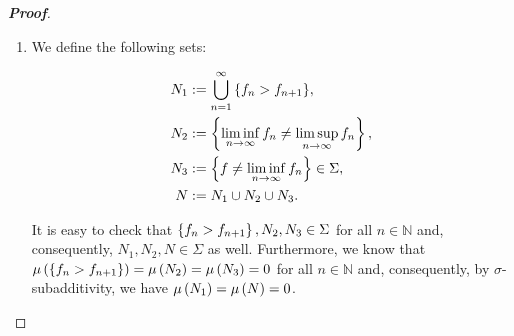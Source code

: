\begin{theorem}
\begin{proof}[\rm\textbf{Proof}]
\begin{enumerate}
      \begin{equation}
        \int_{X}{f_n\,d\mu}\geq\int_{E_n}{f_n\,d\mu}\geq\int_{E_n}{\pr{c\cdot\varphi}\,d\mu}=c\cdot\int_{E_n}{\varphi\,d\mu}.
      \end{equation}

      Since the map $\nu_{c\cdot\varphi}:E\in\Sigma\mapsto\int_{E}{\pr{c\cdot\varphi}\,d\mu}\in\br{0,+\infty}$ is a measure on $\pr{X,\Sigma}$ and $E_n\subseteq E_{n+1}$ for all $n\in\mathbb{N}$, we have:

      \begin{equation}
        \begin{split}
          c\cdot\int_{X}{\varphi\,d\mu} & =\int_{X}{\pr{c\cdot\varphi}\,d\mu}=\int_{N^c}{\pr{c\cdot\varphi}\,d\mu}=\nu_{c\cdot\varphi}\pr{N^c}=\nu_{c\cdot\varphi}\pr{\bigcup_{n=1}^{\infty}{E_n}}\\
          & =\lim_{n\to\infty}{\nu_{c\cdot\varphi}\pr{E_n}}=\lim_{n\to\infty}{\int_{E_n}{\pr{c\cdot\varphi}\,d\mu}}\leq\lim_{n\to\infty}{\int_{X}{f_n}\,d\mu}.
        \end{split}
      \end{equation}

      Taking the limit when $c\to 1^-$, we obtained $\int_{X}{\varphi\,d\mu}\leq\lim_{n\to\infty}{\int_{X}{f_n}\,d\mu}$. Thus $\int_{X}{f\,d\mu}\leq\lim_{n\to\infty}{\int_{X}{f_n\,d\mu}}$. Therefore:

      \begin{equation}
        \lim_{n\to\infty}{\int_{X}{f_n}\,d\mu}=\int_{X}{f\,d\mu}.
      \end{equation}
      \item We define the following sets:
      
      \begin{equation}
        \begin{split}
          N_1 & :=\bigcup_{n=1}^{\infty}{\left\{f_n>f_{n+1}\right\}},\\
          N_2 & :=\left\{\liminf_{n\to\infty}{f_n}\neq\limsup_{n\to\infty}{f_n}\right\},\\
          N_3 & :=\left\{f\neq\liminf_{n\to\infty}{f_n}\right\}\in\Sigma,\\
          N & :=N_1\cup N_2\cup N_3.
        \end{split}
      \end{equation}
      
      It is easy to check that $\left\{f_n>f_{n+1}\right\},N_2,N_3\in\Sigma$ for all $n\in\mathbb{N}$ and, consequently, $N_1,N_2,N\in\Sigma$ as well. Furthermore, we know that $\mu\left(\left\{f_n>f_{n+1}\right\}\right)=\mu\left(N_2\right)=\mu\left(N_3\right)=0$ for all $n\in\mathbb{N}$ and, consequently, by $\sigma$-subadditivity, we have $\mu\left(N_1\right)=\mu\left(N\right)=0$.


\end{enumerate}
\end{proof}
\end{theorem}
